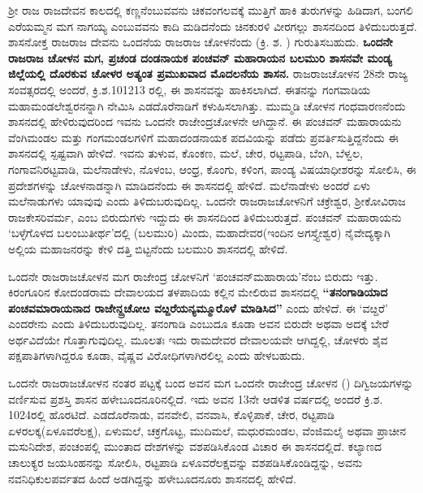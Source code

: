 ಶ‍್ರೀ ರಾಜ ರಾಜದೇವನ ಕಾಲದಲ್ಲಿ ಕಣ್ಣನೆಂಬುವವನು ಚಿಕವಂಗಲವಕ್ಕೆ ಮುತ್ತಿಗೆ ಹಾಕಿ ತುರುಗಳನ್ನು ಹಿಡಿದಾಗ, ಬಂಗಲಿ ಎರೆಯಮ್ಮನ ಮಗ ನಾಗಯ್ಯ ಎಂಬುವವನು ಕಾದಿ ಮಡಿದನೆಂದು ಚಿನಕುರಳಿ ವೀರಗಲ್ಲು ಶಾಸನದಿಂದ ತಿಳಿದು\-ಬರುತ್ತದೆ. ಶಾಸನೋಕ್ತ ರಾಜರಾಜ ದೇವನು ಒಂದನೆಯ ರಾಜರಾಜ ಚೋಳನೆಂದು (ಕ್ರಿ. ಶ. ) ಗುರುತಿಸಬಹುದು. \textbf{ಒಂದನೇ ರಾಜರಾಜ ಚೋಳನ ಮಗ, ಪ್ರಚಂಡ ದಂಡನಾಯಕ ಪಂಚವನ್​ ಮಹಾರಾಯನ ಬಲಮುರಿ ಶಾಸನವೇ ಮಂಡ್ಯ ಜಿಲ್ಲೆಯಲ್ಲಿ ದೊರಕುವ ಚೋಳರ ಅತ್ಯಂತ ಪ್ರಮುಖವಾದ ಮೊದಲನೆಯ ಶಾಸನ.} ರಾಜರಾಜಚೋಳನ 28ನೇ ರಾಜ್ಯ ಸಂವತ್ಸರದಲ್ಲಿ ಅಂದರೆ, ಕ್ರಿ.ಶ.1012\enginline{-}13 ರಲ್ಲಿ, ಈ ಶಾಸನವನ್ನು ಹಾಕಿಸಲಾಗಿದೆ. ಈತನನ್ನು ಗಂಗವಾಡಿಯ ಮಹಾಮಂಡಲೇಶ್ವರನನ್ನಾಗಿ ನೇಮಿಸಿ ಎಡದೊರೆನಾಡಿಗೆ ಕಳುಹಿಸಲಾಗಿತ್ತು. ಮುಮ್ಮಡಿ ಚೋಳನ ಗಂಧವಾರಣನೆಂದು ಶಾಸನದಲ್ಲಿ ಹೇಳಿರುವುದರಿಂದ ಇವನು ಒಂದನೇ ರಾಜೇಂದ್ರಚೋಳನೇ ಆಗಿದ್ದಾನೆ. ಈ ಪಂಚವನ್​ ಮಹಾರಾಯನು ವೆಂಗಿಮಂಡಲ ಮತ್ತು ಗಂಗಮಂಡಲಗಳಿಗೆ ಮಹಾದಂಡನಾಯಕ ಪದವಿಯನ್ನು ಪಡೆದು ಪ್ರವರ್ತಿಸುತ್ತಿದ್ದನೆಂದು ಈ ಶಾಸನದಲ್ಲಿ ಸ್ಪಷ್ಟವಾಗಿ ಹೇಳಿದೆ. ಇವನು ತುಳುವ, ಕೊಂಕಣ, ಮಲೆ, ಚೇರ, ರಟ್ಟಪಾಡಿ, ಬೆಂಗಿ, ಬೆಳ್ವಲ, ಗಂಗಾವನಿರಟ್ಟವಾಡಿ, ಮಲೆನಾಡೇಳು, ನೊಳಂಬ, ಆಂಧ್ರ, ಕೊಂಗು, ಕಳಿಂಗ, ಪಾಂಡ್ಯ ವಿಷಯಾಧೀಶರನ್ನು ಸೋಲಿಸಿ, ಈ ಪ್ರದೇಶಗಳನ್ನು ಚೋಳನಾಡನ್ನಾಗಿ ಮಾಡಿದನೆಂದು ಈ ಶಾಸನದಲ್ಲಿ ಹೇಳಿದೆ. ಮಲೆನಾಡೇಳು ಅಂದರೆ ಏಳು ಮಲೆನಾಡುಗಳು ಯಾವುವು ಎಂದು ತಿಳಿದುಬರುವುದಿಲ್ಲ. ಒಂದನೇ ರಾಜರಾಜಚೋಳನಿಗೆ ಚಕ್ರೇಶ್ವರ, ಶ‍್ರೀಕೋವಿರಾಜ ರಾಜಕೇಸರಿವರ್ಮ, ಎಂಬ ಬಿರುದುಗಳು ಇದ್ದುದು ಈ ಶಾಸನದಿಂದ ತಿಳಿದುಬರುತ್ತದೆ. ಪಂಚವನ್​ ಮಹಾರಾಯನು ‘ಬಳ್ಳೆಗೊಳದ ಬಲಂಬುತೀರ್ಥ’ದಲ್ಲಿ (ಬಲಮುರಿ) ಮಿಂದು, ಮಹಾದೇವರ(ಇಂದಿನ ಅಗಸ್ತ್ಯೇಶ್ವರ) ನೈವೇದ್ಯ\-ಕ್ಕಾಗಿ ಅಲ್ಲಿಯ ಮಹಾಜನರನ್ನು ಕೇಳಿ ದತ್ತಿ ಬಿಟ್ಟನೆಂದು ಬಲಮುರಿ ಶಾಸನದಲ್ಲಿ ಹೇಳಿದೆ.

ಒಂದನೇ ರಾಜರಾಜಚೋಳನ ಮಗ ರಾಜೇಂದ್ರ ಚೋಳನಿಗೆ ‘ಪಂಚವನ್​ಮಹಾರಾಯ’ನೆಂಬ ಬಿರುದು ಇತ್ತು. ಕಿರಂಗೂರಿನ ಕೋದಂಡರಾಮ ದೇವಾಲಯದ ತಳಪಾದಿಯ ಕಲ್ಲಿನ ಮೇಲಿರುವ ಶಾಸನದಲ್ಲಿ \textbf{“ತನಂಗಾಡಿಯಾದ\general{\break } ಪಂಚವಮಾರಾಯನಾದ ರಾಜೇನ್ದ್ರಚೋೞ ವೞ್ದರೆಯನ್ಯಮ್ಮೂರೊಳೆ ಮಾಡಿಸಿದ”} ಎಂದು ಹೇಳಿದೆ. ಈ ‘ವೞ್ದರೆ’ ಎಂದರೇನು ಎಂದು ತಿಳಿದುಬರುವುದಿಲ್ಲ. ತನಂಗಾಡಿ ಎಂಬುದೂ ಕೂಡಾ ಅವನ ಬಿರುದೇ ಅಥವಾ ಅದಕ್ಕೆ ಬೇರೆ ಅರ್ಥವಿದೆಯೇ ಗೊತ್ತಾಗುವುದಿಲ್ಲ. ಮೂಲತಃ ಇದು ರಾಮದೇವರ ದೇವಾಲಯವೇ ಆಗಿದ್ದಲ್ಲಿ, ಚೋಳರು ಶೈವ ಪಕ್ಷಪಾತಿಗಳಾಗಿದ್ದರೂ ಕೂಡಾ, ವೈಷ್ಣವ ವಿರೋಧಿಗಳಾಗಿರಲಿಲ್ಲ ಎಂದು ಹೇಳಬಹುದು.

ಒಂದನೇ ರಾಜರಾಜಚೋಳನ ನಂತರ ಪಟ್ಟಕ್ಕೆ ಬಂದ ಅವನ ಮಗ ಒಂದನೇ ರಾಜೇಂದ್ರ ಚೋಳನ () ದಿಗ್ವಿಜಯಗಳನ್ನು ವರ್ಣಿಸುವ ಪ್ರಶಸ್ತಿ ಶಾಸನ ಹಳೇಬೂದನೂರಿನಲ್ಲಿದೆ. ಇದು ಅವನ 13ನೇ ಆಡಳಿತ ವರ್ಷದಲ್ಲಿ ಅಂದರೆ ಕ್ರಿ.ಶ. 1024ರಲ್ಲಿ ಹೊರಟಿದೆ. ಎಡದೊರೆನಾಡು, ವನವೇಲಿ, ವನವಾಸಿ, ಕೊಳ್ಳಿಪಾಕೆ, ಚೇರ, ರಟ್ಟಪಾಡಿ ಏಳರಲಕ್ಕ(ಏಳೂವರೆಲಕ್ಷ), ಏಳುಮಲೆ, ಚಕ್ರಗೊಟ್ಟ, ಮುದಿಮಲೆ, ಮಧುರಮಂಡಲ, ವೆಂಜಿಮಲೈ ಅಥವಾ ಪ್ರಾಚೀನ ಮಸುನಿದೇಶ, ಪಂಚಂಪಲ್ಲಿ ಮುಂತಾದ ದೇಶಗಳನ್ನು ವಶಪಡಿಸಿಕೊಂಡ ವಿಚಾರ ಈ ಶಾಸನದಲ್ಲಿದೆ. ಕಲ್ಯಾಣದ ಚಾಲುಕ್ಯರ ಜಯಸಿಂಹನನ್ನು ಸೋಲಿಸಿ, ರಟ್ಟಪಾಡಿ ಏಳೂವರೆಲಕ್ಷವನ್ನು ವಶಪಡಿಸಿಕೊಂಡಿದ್ದನ್ನು, ಅವನು ನವನಿಧಿಕುಲಪರ್ವತದ ಹಿಂದೆ ಅಡಗಿದ್ದನ್ನು ಹಳೇಬೂದನೂರು ಶಾಸನದಲ್ಲಿ ಹೇಳಿದೆ.

